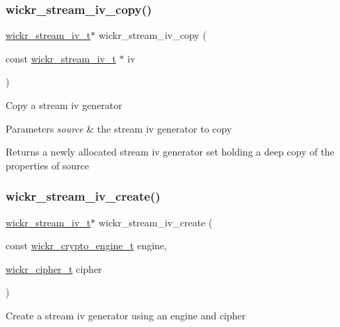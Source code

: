 \subsubsection{\texorpdfstring{wickr\+\_\+stream\+\_\+iv\+\_\+copy()}{wickr\_stream\_iv\_copy()}}
{\footnotesize\ttfamily \hyperlink{structwickr__stream__iv}{wickr\+\_\+stream\+\_\+iv\+\_\+t}$\ast$ wickr\+\_\+stream\+\_\+iv\+\_\+copy (\begin{DoxyParamCaption}\item[{const \hyperlink{structwickr__stream__iv}{wickr\+\_\+stream\+\_\+iv\+\_\+t} $\ast$}]{iv }\end{DoxyParamCaption})}

Copy a stream iv generator


\begin{DoxyParams}{Parameters}
{\em source} & the stream iv generator to copy \\
\hline
\end{DoxyParams}
\begin{DoxyReturn}{Returns}
a newly allocated stream iv generator set holding a deep copy of the properties of \textquotesingle{}source\textquotesingle{} 
\end{DoxyReturn}
\mbox{\label{group__wickr__stream__iv_gaaad5726a228b7866b0cb392c131f95be}} 
\subsubsection{\texorpdfstring{wickr\+\_\+stream\+\_\+iv\+\_\+create()}{wickr\_stream\_iv\_create()}}
{\footnotesize\ttfamily \hyperlink{structwickr__stream__iv}{wickr\+\_\+stream\+\_\+iv\+\_\+t}$\ast$ wickr\+\_\+stream\+\_\+iv\+\_\+create (\begin{DoxyParamCaption}\item[{const \hyperlink{structwickr__crypto__engine}{wickr\+\_\+crypto\+\_\+engine\+\_\+t}}]{engine,  }\item[{\hyperlink{structwickr__cipher}{wickr\+\_\+cipher\+\_\+t}}]{cipher }\end{DoxyParamCaption})}

Create a stream iv generator using an engine and cipher


